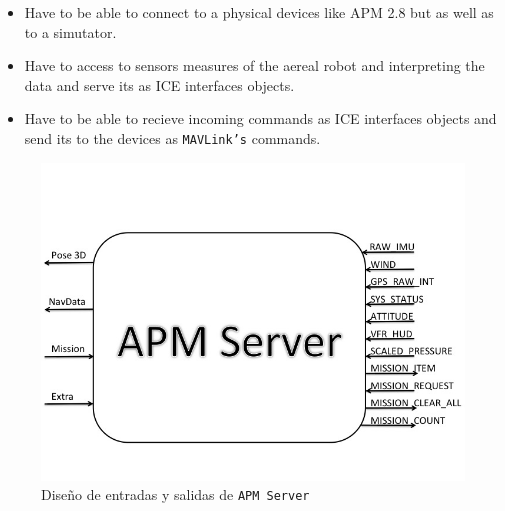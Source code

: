 \begin{itemize}
\item Have to be able to connect to a physical devices like APM 2.8 but as well as to a simutator.
\item Have to access to sensors measures of the aereal robot and interpreting the data and serve its as ICE interfaces objects.
\item Have to be able to recieve incoming commands as ICE interfaces objects and send its to the devices as \texttt{MAVLink's} commands.
\end{itemize}
\begin{figure}[h]
  \centering
  \includegraphics[scale=0.5]{img/diseno.jpg}
  \caption{Diseño de entradas y salidas de \texttt{APM Server}}
  \label{fig:diseno_apms_caja_negra}
\end{figure}

